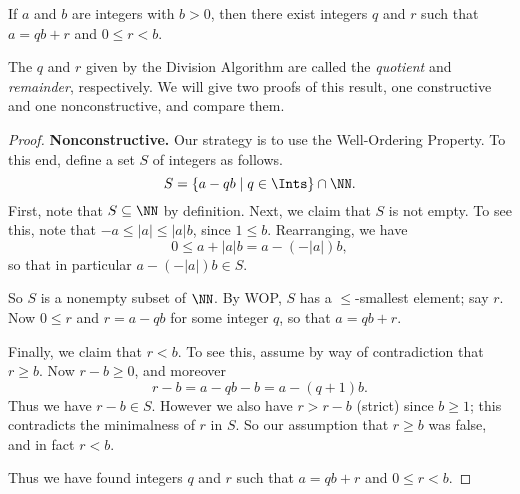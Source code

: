 \documentclass{article}
\begin{document}

\begin{thm}
If $a$ and $b$ are integers with $b > 0$, then there exist integers $q$ and $r$ such that $a = qb + r$ and $0 \leq r < b$.
\end{thm}

The $q$ and $r$ given by the Division Algorithm are called the \emph{quotient} and \emph{remainder}, respectively. We will give two proofs of this result, one constructive and one nonconstructive, and compare them.



\begin{proof}
\textbf{Nonconstructive.} Our strategy is to use the Well-Ordering Property. To this end, define a set $S$ of integers as follows. \[ S = \{ a - qb \mid q \in \Ints \} \cap \NN. \] First, note that $S \subseteq \NN$ by definition. Next, we claim that $S$ is not empty. To see this, note that $-a \leq |a| \leq |a|b$, since $1 \leq b$. Rearranging, we have \[ 0 \leq a + |a|b = a - (-|a|)b, \] so that in particular $a - (-|a|)b \in S$.

So $S$ is a nonempty subset of $\NN$. By WOP, $S$ has a $\leq$-smallest element; say $r$. Now $0 \leq r$ and $r = a - qb$ for some integer $q$, so that $a = qb + r$.

Finally, we claim that $r < b$. To see this, assume by way of contradiction that $r \geq b$. Now $r-b \geq 0$, and moreover \[ r-b = a - qb - b = a - (q+1)b. \] Thus we have $r-b \in S$. However we also have $r > r-b$ (strict) since $b \geq 1$; this contradicts the minimalness of $r$ in $S$. So our assumption that $r \geq b$ was false, and in fact $r < b$.

Thus we have found integers $q$ and $r$ such that $a = qb + r$ and $0 \leq r < b$.
\end{proof}
\end{document}
